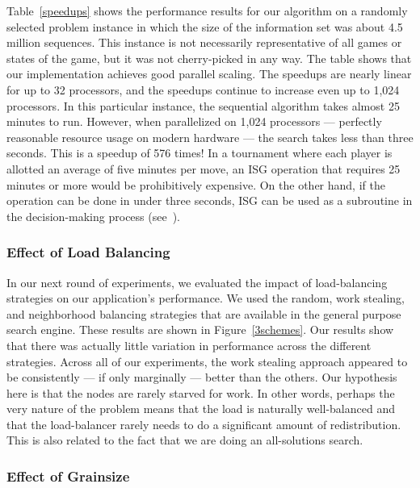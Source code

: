 \documentclass[10pt, conference, compsocconf]{IEEEtran}
\begin{document}
Table~\ref{speedups} shows the performance results for our algorithm on a
randomly selected problem instance in which the size of the information set was
about 4.5 million sequences.  This instance is not necessarily representative of all
games or states of the game, but it was not cherry-picked in any way. The table
shows that our implementation achieves good parallel scaling. The speedups are nearly
linear for up to 32 processors, and the speedups continue to increase even up
to 1,024 processors. In this particular instance, the sequential algorithm
takes almost 25 minutes to run.  However, when parallelized on 1,024
processors --- perfectly reasonable resource usage on modern hardware --- the
search takes less than three seconds.  This is a speedup of 576 times! In a
tournament where each player is allotted an average of five minutes per move,
an ISG operation that requires 25 minutes or more would be prohibitively
expensive.  On the other hand, if the operation can be done in under three
seconds, ISG can be used as a subroutine in the decision-making process
(see~\cite{parker05game}). 



\subsubsection{Effect of Load Balancing}

In our next round of experiments, we evaluated the impact of load-balancing
strategies on our application's performance.  We used the random, work stealing, and
neighborhood balancing strategies that are available in the general purpose
search engine.  These results are shown in Figure~\ref{3schemes}.  Our results
show that there was actually little variation in performance across the
different strategies.  Across all of our experiments, the work stealing
approach appeared to be consistently --- if only marginally --- better than the
others.  Our hypothesis here is that the nodes are rarely starved for work.  In
other words, perhaps the very nature of the problem means that the load is
naturally well-balanced and that the load-balancer rarely needs to do a
significant amount of redistribution.  This is also related to the
fact that we are doing an all-solutions search. 

\subsubsection{Effect of Grainsize}
\end{document}
